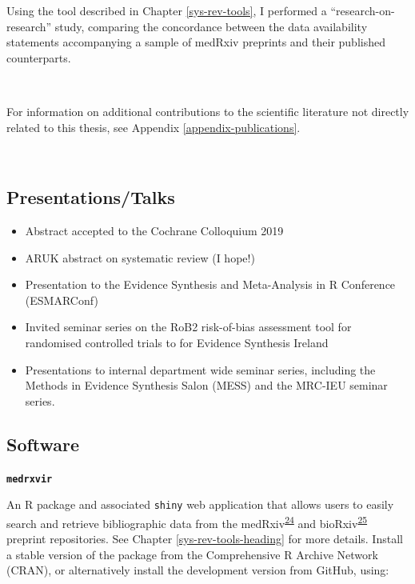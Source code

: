 \documentclass[a4paper, twoside]{templates/ociamthesis}
\providecommand{\tightlist}{%
  \setlength{\itemsep}{0pt}\setlength{\parskip}{0pt}}
\begin{document}
Using the tool described in Chapter \ref{sys-rev-tools}, I performed a ``research-on-research'' study, comparing the concordance between the data availability statements accompanying a sample of medRxiv preprints and their published counterparts.

~

For information on additional contributions to the scientific literature not directly related to this thesis, see Appendix \ref{appendix-publications}.

~

\hypertarget{presentationstalks}{%
\subsection{Presentations/Talks}\label{presentationstalks}}

\begin{itemize}
\tightlist
\item
  Abstract accepted to the Cochrane Colloquium 2019
\item
  ARUK abstract on systematic review (I hope!)
\item
  Presentation to the Evidence Synthesis and Meta-Analysis in R Conference (ESMARConf)
\item
  Invited seminar series on the RoB2 risk-of-bias assessment tool for randomised controlled trials to for Evidence Synthesis Ireland
\item
  Presentations to internal department wide seminar series, including the Methods in Evidence Synthesis Salon (MESS) and the MRC-IEU seminar series.
\end{itemize}

\hypertarget{outputs-software}{%
\subsection{Software}\label{outputs-software}}

\textbf{\texttt{medrxvir}}

An R package and associated \texttt{shiny} web application that allows users to easily search and retrieve bibliographic data from the medRxiv\textsuperscript{\protect\hyperlink{ref-rawlinson2019}{24}} and bioRxiv\textsuperscript{\protect\hyperlink{ref-sever2019}{25}} preprint repositories. See Chapter \ref{sys-rev-tools-heading} for more details. Install a stable version of the package from the Comprehensive R Archive Network (CRAN), or alternatively install the development version from GitHub, using:
\end{document}
